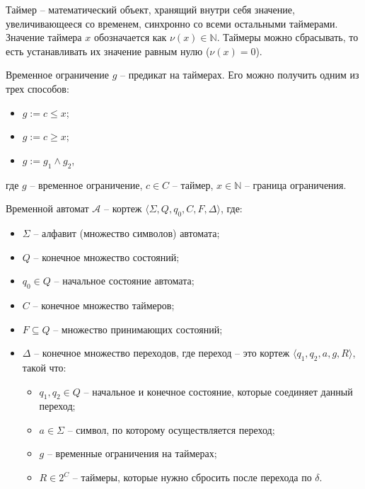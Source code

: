 \documentclass[times,specification,annotation]{itmo-student-thesis}
\begin{document}
\begin{definition}
  Таймер -- математический объект, хранящий внутри себя значение, увеличивающееся со временем, синхронно со всеми остальными таймерами. 
  Значение таймера $x$ обозначается как $\nu(x) \in \mathbb{N}$. Таймеры можно сбрасывать, то есть устанавливать их значение равным нулю ($\nu(x) = 0$).
\end{definition}

\begin{definition}
  Временное ограничение $g$ -- предикат на таймерах. Его можно получить одним из трех способов:
  \begin{itemize}
    \item $g := c \leq x$;
    \item $g := c \geq x$;
    \item $g := g_1 \land g_2$,
  \end{itemize}
  где $g$ -- временное ограничение, $c \in C$ -- таймер, $x \in \mathbb{N}$ -- граница ограничения.
\end{definition}

\begin{definition}
  Временной автомат $\mathcal{A}$ -- кортеж $\langle \Sigma, Q, q_0, C, F, \Delta \rangle$, где:
  \begin{itemize}
    \item $\Sigma$ -- алфавит (множество символов) автомата;
    \item $Q$ -- конечное множество состояний;
    \item $q_0 \in Q$ -- начальное состояние автомата;
    \item $C$ -- конечное множество таймеров;
    \item $F \subseteq Q$ -- множество принимающих состояний;
    \item $\Delta$ -- конечное множество переходов, где переход -- это кортеж $\langle q_1, q_2, a, g, R \rangle$, такой что:
    \begin{itemize}
      \item $q_1, q_2 \in Q$ -- начальное и конечное состояние, которые соединяет данный переход;
      \item $a \in \Sigma$ -- символ, по которому осуществляется переход;
      \item $g$ -- временные ограничения на таймерах;
      \item $R \in 2^{C}$ -- таймеры, которые нужно сбросить после перехода по $\delta$.
    \end{itemize}
  \end{itemize}
  \label{timed-automaton}
\end{definition}
\end{document}
